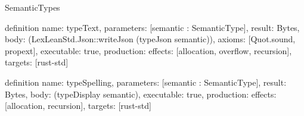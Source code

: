 \begin{lexlean}{SemanticTypes}
\begin{semanticmodule}
definition{
  name: typeText,
  parameters: [semantic : SemanticType],
  result: Bytes,
  body: (LexLeanStd.Json::writeJson (typeJson semantic)),
  axioms: [Quot.sound, propext],
  executable: true,
  production: {effects: [allocation, overflow, recursion], targets: [rust-std]}
}

definition{
  name: typeSpelling,
  parameters: [semantic : SemanticType],
  result: Bytes,
  body: (typeDisplay semantic),
  executable: true,
  production: {effects: [allocation, recursion], targets: [rust-std]}
}
\end{semanticmodule}
\end{lexlean}

